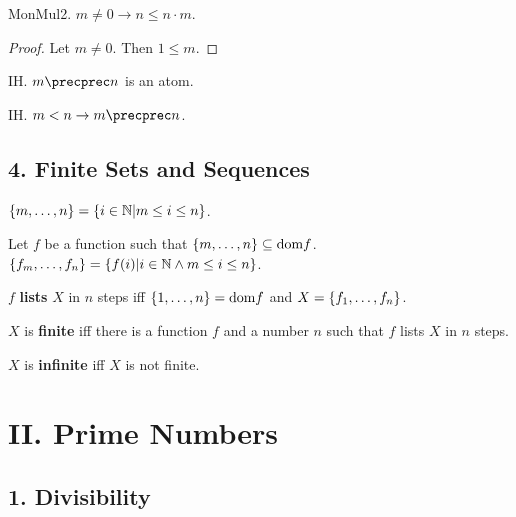 \begin{lemma} MonMul2. $m \neq 0 \rightarrow n \leq n \cdot m$.
\end{lemma}
\begin{proof}
Let $m \neq 0$. Then $1 \leq m$.
\end{proof}

\begin{signature} IH. $m \precprec n$ is an atom.
\end{signature}

\begin{axiom} IH. $m < n \rightarrow m \precprec n$. \end{axiom}

\subsection{4. Finite Sets and Sequences}

\begin{definitionp} 
$\{m,\dots,n\} = \{ i \in {\Bbb N} | m \leq i \leq n \}$.
\end{definitionp}


\begin{definitionp} 
Let $f$ be a function such that 
$\{m,\dots,n\} \subseteq \text{dom} f$. 
$\{f_{m},\dots,f_{n}\} = \{ f(i) | i \in {\Bbb N} \wedge m \leq i \leq n \}$.
\end{definitionp}

\begin{definitionp} $f$ {\bf lists} $X$ in $n$ steps iff 
$\{1,\dots,n\} = \text{dom} f$ and $X = \{f_{1},\dots,f_{n}\}$.
\end{definitionp}

\begin{definitionp} $X$ is {\bf finite} iff there is a function
$f$ and a number $n$ such that $f$ lists $X$ in $n$ steps.
\end{definitionp}

\begin{definitionp} $X$ is {\bf infinite} iff $X$ is not finite.
\end{definitionp}

\section{II. Prime Numbers}

\subsection{1. Divisibility}

